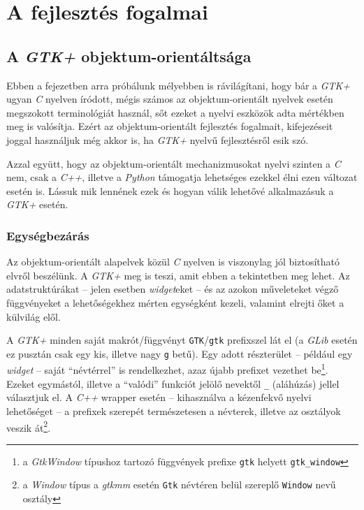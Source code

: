 \section{A fejlesztés fogalmai}

\subsection{A \textit{GTK+} objektum-orientáltsága}

Ebben a fejezetben arra próbálunk mélyebben is rávilágítani, hogy bár a \textit{GTK+} ugyan \textit{C} nyelven íródott, mégis számos az objektum-orientált nyelvek esetén megszokott terminológiát használ, sőt ezeket a nyelvi eszközök adta mértékben meg is valósítja. Ezért az objektum-orientált fejlesztés fogalmait, kifejezéseit joggal használjuk még akkor is, ha \textit{GTK+} nyelvű fejlesztésről esik szó.

Azzal együtt, hogy az objektum-orientált mechanizmusokat nyelvi szinten a \textit{C} nem, csak a \textit{C++}, illetve a \textit{Python} támogatja lehetséges ezekkel élni ezen változat esetén is. Lássuk mik lennének ezek és hogyan válik lehetővé alkalmazásuk a \textit{GTK+} esetén.

\subsubsection{Egységbezárás}

Az objektum-orientált alapelvek közül \textit{C} nyelven is viszonylag jól biztosítható elvről beszélünk. A \textit{GTK+} meg is teszi, amit ebben a tekintetben meg lehet. Az adatstruktúrákat -- jelen esetben \textit{widget}eket -- és az azokon műveleteket végző függvényeket a lehetőségekhez mérten egységként kezeli, valamint elrejti őket a külvilág elől.

A \textit{GTK+} minden saját makrót/függvényt \texttt{GTK}/\texttt{gtk} prefixszel lát el (a \textit{GLib} esetén ez pusztán csak egy kis, illetve nagy \texttt{g} betű). Egy adott részterület -- például egy \textit{widget} -- saját ``névtérrel'' is rendelkezhet, azaz újabb prefixet vezethet be\footnote{a \textit{GtkWindow} típushoz tartozó függvények prefixe \texttt{gtk} helyett \texttt{gtk\_window}}. Ezeket egymástól, illetve a ``valódi'' funkciót jelölő nevektől \texttt{\_} (aláhúzás) jellel választjuk el. A \textit{C++} wrapper esetén -- kihasználva a kézenfekvő nyelvi lehetőséget -- a prefixek szerepét természetesen a névterek, illetve az osztályok veszik át\footnote{a \textit{Window} típus a \textit{gtkmm} esetén \texttt{Gtk} névtéren belül szereplő \texttt{Window} nevű osztály}.

